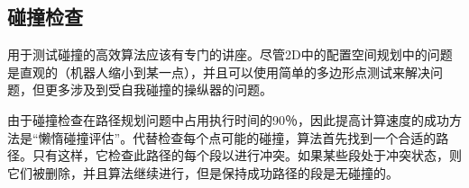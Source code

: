

\subsection{碰撞检查}
用于测试碰撞的高效算法应该有专门的讲座。尽管2D中的配置空间规划中的问题是直观的（机器人缩小到某一点），并且可以使用简单的多边形点测试来解决问题，但更多涉及到受自我碰撞的操纵器的问题。

由于碰撞检查在路径规划问题中占用执行时间的90％，因此提高计算速度的成功方法是“懒惰碰撞评估”。代替检查每个点可能的碰撞，算法首先找到一个合适的路径。只有这样，它检查此路径的每个段以进行冲突。如果某些段处于冲突状态，则它们被删除，并且算法继续进行，但是保持成功路径的段是无碰撞的。


